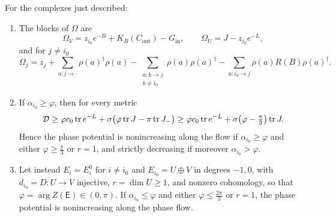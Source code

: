\begin{theorem}\label{thm:onevertex}
For the complexes just described:
\begin{enumerate}
\item[(a)] The blocks of $\Omega$ are
 \[
 \Omega_V=z_{i_0}e^{-B}+K_B(C_{\mathrm{out}})-G_{\mathrm{in}},\qquad
 \Omega_U=J-z_{i_0}e^{-L},
 \]
 and for $j\neq i_0$
 \[
 \Omega_j=z_j+\sum_{a:j\to\cdot}\rho(a)^\dagger\rho(a)
 -\sum_{\substack{a:k\to j\\k\neq i_0}}\rho(a)\rho(a)^\dagger
 -\sum_{a:i_0\to j}\rho(a)R(B)\rho(a)^\dagger .
 \]
\item[(b)] If $\alpha_{i_0}\geq\varphi$, then for every metric
 \[
 \mathcal D\geq\varphi c_0\operatorname{tr} e^{-L}+\sigma\bigl(\varphi\operatorname{tr} J-\pi\operatorname{tr} J_-\bigr)
 \geq\varphi c_0\operatorname{tr} e^{-L}+\sigma\bigl(\varphi-\tfrac{\pi}3\bigr)\operatorname{tr} J .
 \]
 Hence the phase potential is nonincreasing along the flow if
 $\alpha_{i_0}\geq\varphi$ and either $\varphi\geq\frac{\pi}3$ or $r=1$, and
 strictly decreasing if moreover $\alpha_{i_0}>\varphi$.
\item[(c)] Let instead $E_i=E_i^0$ for $i\neq i_0$ and
 $E_{i_0}=U\oplus V$ in degrees $-1,0$, with $d_{i_0}=D:U\to V$ injective,
 $r=\dim U\geq1$, and nonzero cohomology, so that
 $\varphi=\arg Z(\mathsf E)\in(0,\pi)$. If $\alpha_{i_0}\leq\varphi$ and
 either $\varphi\leq\frac{2\pi}3$ or $r=1$, the phase potential is
 nonincreasing along the phase flow.
\end{enumerate}
\end{theorem}

